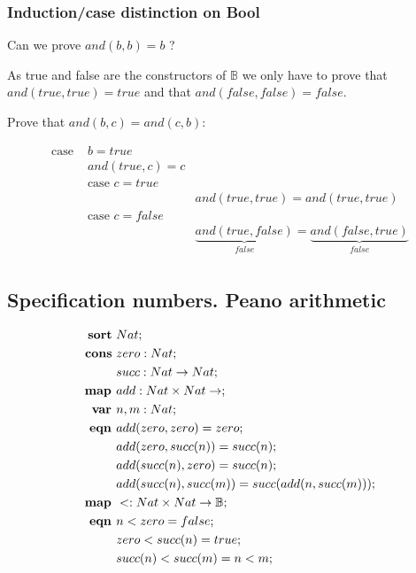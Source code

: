 \subsubsection{Induction/case distinction on Bool}
Can we prove $and(b, b) = b$ ?

As true and false are the constructors of $\mathbb{B}$ we only have to prove that 
$and(true, true) = true$ and that $and(false, false) = false$.

Prove that $and(b, c) = and(c, b)$:

\begin{align*}
  \text{case } & b = true \\
  & and(true, c) = c \\
  & \text{case } c = true \\
  & & and(true, true) = and(true, true) \\
  & \text{case } c = false \\
  & & \underbrace{and(true, false)}_{false} = \underbrace{and(false, true)}_{false} \\
\end{align*}

\subsection{Specification numbers. Peano arithmetic}

\begin{align*}
  \text{\textbf{sort} } & Nat; \\
  \text{\textbf{cons} } & zero: Nat; \\
  & succ: Nat \rightarrow Nat; \\
  \text{\textbf{map }} & add: Nat \times Nat \rightarrow; \\
  \text{\textbf{var }} & n, m: Nat; \\
  \text{\textbf{eqn }} & add(zero, zero) = zero; \\
  & add(zero, succ(n)) = succ(n); \\
  & add(succ(n), zero) = succ(n); \\
  & add(succ(n), succ(m)) = succ(add(n, succ(m))); \\
  \text{\textbf{map }} & <: Nat \times Nat \rightarrow \mathbb{B}; \\
  \text{\textbf{eqn }} & n < zero = false; \\
  & zero < succ(n) = true; \\
  & succ(n) < succ(m) = n < m;
\end{align*}

